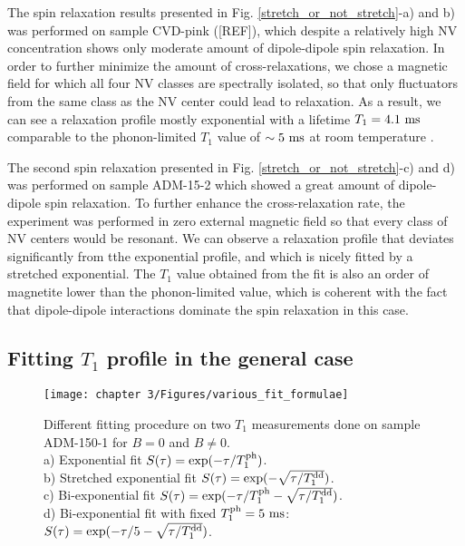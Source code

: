 \documentclass[a4paper, 11pt]{book}
\begin{document}
The spin relaxation results presented in Fig. \ref{stretch_or_not_stretch}-a) and b) was performed on sample CVD-pink ([REF]), which despite a relatively high NV concentration shows only moderate amount of dipole-dipole spin relaxation. In order to further minimize the amount of cross-relaxations, we chose a magnetic field for which all four NV classes are spectrally isolated, so that only fluctuators from the same class as the NV center could lead to relaxation. As a result, we can see a relaxation profile mostly exponential with a lifetime $T_1=4.1\ \rm ms$ comparable to the phonon-limited $T_1$ value of $\sim 5\ \rm ms$ at room temperature \citep{jarmola2012temperature}.

The second spin relaxation presented in Fig. \ref{stretch_or_not_stretch}-c) and d) was performed on sample ADM-15-2 which showed a great amount of dipole-dipole spin relaxation. To further enhance the cross-relaxation rate, the experiment was performed in zero external magnetic field so that every class of NV centers would be resonant. We can observe a relaxation profile that deviates significantly from tthe exponential profile, and which is nicely fitted by a stretched exponential. The $T_1$ value obtained from the fit is also an order of magnetite lower than the phonon-limited value, which is coherent with the fact that dipole-dipole interactions dominate the spin relaxation in this case.

\subsection{Fitting $T_1$ profile in the general case}

\begin{figure}[h]
\centering
\texttt{[image: chapter 3/Figures/various\_fit\_formulae]}
\caption{Different fitting procedure on two $T_1$ measurements done on sample ADM-150-1 for $B=0$ and $B\neq0$. \\ a) Exponential fit $S(\tau)=\exp (-\tau/T_1^{\rm ph})$. \\ b) Stretched exponential fit $S(\tau)=\exp (-\sqrt{\tau/T_1^{\rm dd}})$. \\ c) Bi-exponential fit $S(\tau)=\exp (-\tau/T_1^{\rm ph} -\sqrt{\tau/T_1^{\rm dd}})$. \\ d) Bi-exponential fit with fixed $T_1^{\rm ph}=5\ \rm ms$: $S(\tau)=\exp (-\tau/5 -\sqrt{\tau/T_1^{\rm dd}})$.}
\label{various_fit_formulae}
\end{figure}
\end{document}
